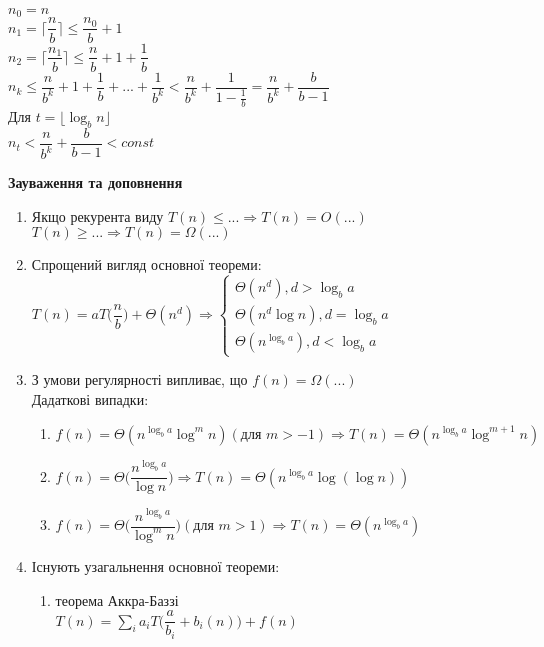 \documentclass[a4paper,12pt]{article}
\newcommand{\dsum}{\displaystyle\sum}
\begin{document}
    $n_0=n$ \\
    $n_1=\bigg\lceil\dfrac{n}{b}\bigg\rceil\leqslant\dfrac{n_0}{b}+1$ \\
    $n_2=\bigg\lceil\dfrac{n_1}{b}\bigg\rceil\leqslant\dfrac{n}{b}+1+\dfrac{1}{b}$ \\
    $n_k\leqslant\dfrac{n}{b^k}+1+\dfrac{1}{b}+...+\dfrac{1}{b^k}<\dfrac{n}{b^k}+\dfrac{1}{1-\frac{1}{b}}=\dfrac{n}{b^k}+\dfrac{b}{b-1}$ \\
    Для $t=\lfloor\log_bn\rfloor$ \\
    $n_t<\dfrac{n}{b^k}+\dfrac{b}{b-1}<const$

\newpage
    \textbf{Зауваження та доповнення} \\
    \begin{enumerate}
        \item Якщо рекурента виду $T(n)\leqslant...\Rightarrow T(n)=O(...)$ \\
        $T(n)\geqslant...\Rightarrow T(n)=\Omega(...)$
        \item Спрощений вигляд основної теореми: \\
        $T(n)=aT\Biggl(\dfrac{n}{b}\Biggr)+\Theta(n^d)\Rightarrow\begin{cases}
            \Theta(n^d), d>\log_ba \\
            \Theta(n^d\log n), d=\log_ba \\
            \Theta(n^{\log_ba}), d<\log_ba
        \end{cases}$
        \item З умови регулярності випливає, що $f(n)=\Omega(...)$ \\
        Дадаткові випадки:
        \begin{enumerate}
            \item $f(n)=\Theta(n^{\log_ba}\log^m n) (\textrm{для }m>-1) \Rightarrow T(n)=\Theta(n^{\log_ba}\log^{m+1}n)$
            \item $f(n)=\Theta\Biggl(\dfrac{n^{\log_ba}}{\log n}\Biggr)\Rightarrow T(n)=\Theta(n^{\log_ba}\log(\log n))$
            \item $f(n)=\Theta\Biggl(\dfrac{n^{\log_ba}}{\log^mn}\Biggr) (\textrm{для } m>1)\Rightarrow T(n)=\Theta(n^{\log_ba})$
        \end{enumerate}
        \item Існують узагальнення основної теореми:
        \begin{enumerate}
            \item теорема Аккра-Баззі \\
            $T(n)=\dsum\limits_{i}a_iT\Biggl(\dfrac{a}{b_i}+b_i(n)\Biggr)+f(n)$
        \end{enumerate}
    \end{enumerate}
\end{document}

